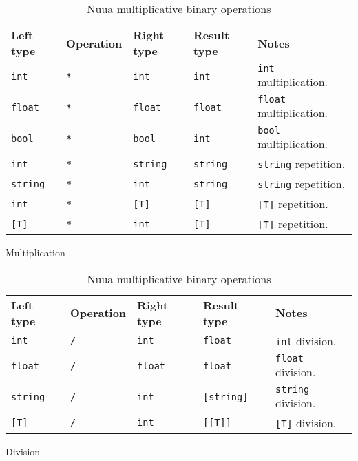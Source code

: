 \begin{table}[H]
    \centering
    \begin{subtable}{\textwidth}
        \centering
        \begin{tabular}{ l l l l p{9.5cm} }
            \textbf{Left type} & \textbf{Operation} & \textbf{Right type} & \textbf{Result type} & \textbf{Notes} \\
            \texttt{int} & \texttt{*} & \texttt{int} & \texttt{int} & \texttt{int} multiplication.\\
            \texttt{float} & \texttt{*} & \texttt{float} & \texttt{float} & \texttt{float} multiplication.\\
            \texttt{bool} & \texttt{*} & \texttt{bool} & \texttt{int} & \texttt{bool} multiplication.\\
            \texttt{int} & \texttt{*} & \texttt{string} & \texttt{string} & \texttt{string} repetition.\\
            \texttt{string} & \texttt{*} & \texttt{int} & \texttt{string} & \texttt{string} repetition.\\
            \texttt{int} & \texttt{*} & \texttt{[T]} & \texttt{[T]} & \texttt{[T]} repetition.\\
            \texttt{[T]} & \texttt{*} & \texttt{int} & \texttt{[T]} & \texttt{[T]} repetition.\\
        \end{tabular}
        \caption{Multiplication}
    \end{subtable}
    \begin{subtable}{\textwidth}
        \centering
        \begin{tabular}{ l l l l p{9.5cm} }
            \textbf{Left type} & \textbf{Operation} & \textbf{Right type} & \textbf{Result type} & \textbf{Notes} \\
            \texttt{int} & \texttt{/} & \texttt{int} & \texttt{float} & \texttt{int} division.\\
            \texttt{float} & \texttt{/} & \texttt{float} & \texttt{float} & \texttt{float} division.\\
            \texttt{string} & \texttt{/} & \texttt{int} & \texttt{[string]} & \texttt{string} division.\\
            \texttt{[T]} & \texttt{/} & \texttt{int} & \texttt{[[T]]} & \texttt{[T]} division.\\
        \end{tabular}
        \caption{Division}
    \end{subtable}
    \caption{Nuua multiplicative binary operations}
    \label{fig:nuua_multiplicative_bin_ops}
\end{table}

